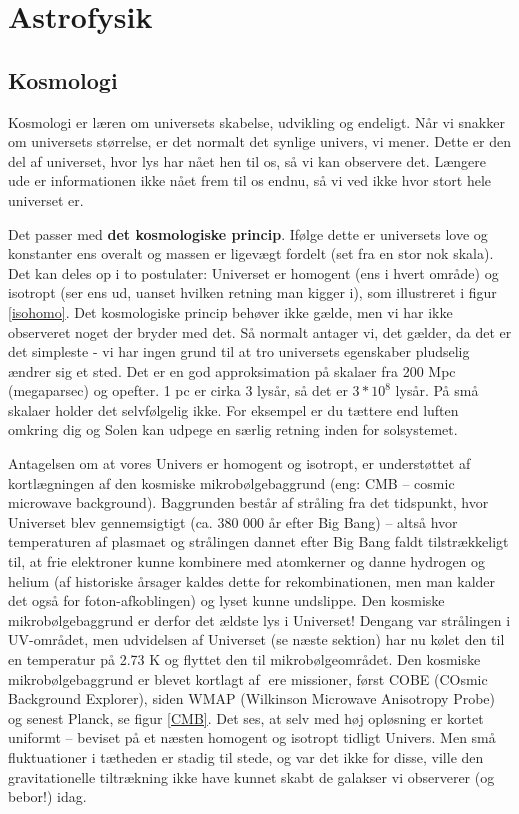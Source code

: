 \chapter{Astrofysik}
\section{Kosmologi}
Kosmologi er læren om universets skabelse, udvikling og endeligt. Når vi snakker om universets størrelse, er det normalt det synlige univers, vi mener. Dette er den del af universet, hvor lys har nået hen til os, så vi kan observere det. Længere ude er informationen ikke nået frem til os endnu, så vi ved ikke hvor stort hele universet er. 

Det passer med \textbf{det kosmologiske princip}. Ifølge dette er universets love og konstanter ens overalt og massen er ligevægt fordelt (set fra en stor nok skala). Det kan deles op i to postulater: Universet er homogent (ens i hvert område) og isotropt (ser ens ud, uanset hvilken retning man kigger i), som illustreret i figur \ref{isohomo}. Det kosmologiske princip behøver ikke gælde, men vi har ikke observeret noget der bryder med det. Så normalt antager vi, det gælder, da det er det simpleste - vi har ingen grund til at tro universets egenskaber pludselig ændrer sig et sted. Det er en god approksimation på skalaer fra 200 Mpc (megaparsec) og opefter. 1 pc er cirka 3 lysår, så det er $3*10^8$ lysår. På små skalaer holder det selvfølgelig ikke. For eksempel er du tættere end luften omkring dig og Solen kan udpege en særlig retning inden for solsystemet.

Antagelsen om at vores Univers er homogent og isotropt, er understøttet af
kortlægningen af den kosmiske mikrobølgebaggrund (eng: CMB – cosmic microwave
background). Baggrunden består af stråling fra det tidspunkt, hvor Universet blev
gennemsigtigt (ca. 380 000 år efter Big Bang) – altså hvor temperaturen af plasmaet
og strålingen dannet efter Big Bang faldt tilstrækkeligt til, at frie elektroner kunne
kombinere med atomkerner og danne hydrogen og helium (af historiske årsager
kaldes dette for rekombinationen, men man kalder det også for foton-afkoblingen)
og lyset kunne undslippe. Den kosmiske mikrobølgebaggrund er derfor det ældste
lys i Universet! Dengang var strålingen i UV-området, men udvidelsen af Universet
(se næste sektion) har nu kølet den til en temperatur på 2.73 K og flyttet den til mikrobølgeområdet. Den kosmiske mikrobølgebaggrund er blevet kortlagt af ere
missioner, først COBE (COsmic Background Explorer), siden WMAP (Wilkinson
Microwave Anisotropy Probe) og senest Planck, se figur \ref{CMB}. Det ses, at selv med høj opløsning er kortet uniformt – beviset på et næsten
homogent og isotropt tidligt Univers. Men små fluktuationer i tætheden er stadig til
stede, og var det ikke for disse, ville den gravitationelle tiltrækning ikke have kunnet
skabt de galakser vi observerer (og bebor!) idag.

